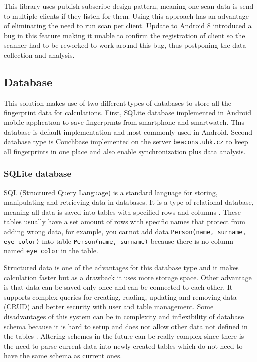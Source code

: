 This library uses publish-subscribe design pattern, meaning one scan data is send to multiple clients if they listen for them. Using this approach has an advantage of eliminating the need to run scan per client. Update to Android 8 introduced a bug in this feature making it unable to confirm the registration of client so the scanner had to be reworked to work around this bug, thus postponing the data collection and analysis.

\subsection{Database}\label{subsec:Database}
This solution makes use of two different types of databases to store all the fingerprint data for calculations. First, SQLite database implemented in Android mobile application to save fingerprints from smartphone and smartwatch. This database is default implementation and most commonly used in Android. Second database type is Couchbase implemented on the server \verb|beacons.uhk.cz| to keep all fingerprints in one place and also enable synchronization plus data analysis.

\subsubsection{SQLite database}\label{subsec:SQLiteDatabase}
SQL (Structured Query Language) is a standard language for storing, manipulating and retrieving data in databases. It is a type of relational database, meaning all data is saved into tables with specified rows and columns \cite{WISQLITE}. These tables usually have a set amount of rows with specific names that protect from adding wrong data, for example, you cannot add data \verb|Person(name, surname, eye color)| into table \verb|Person(name, surname)| because there is no column named \verb|eye color| in the table.

Structured data is one of the advantages for this database type and it makes calculation faster but as a drawback it uses more storage space. Other advantage is that data can be saved only once and can be connected to each other. It supports complex queries for creating, reading, updating and removing data (CRUD) and better security with user and table management. Some disadvantages of this system can be in complexity and inflexibility of database schema because it is hard to setup and does not allow other data not defined in the tables \cite{ERDMS}. Altering schemes in the future can be really complex since there is the need to parse current data into newly created tables which do not need to have the same schema as current ones.

